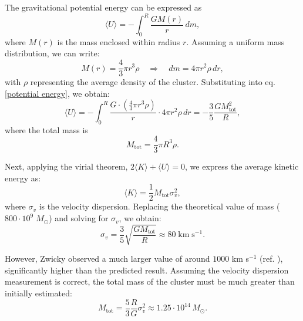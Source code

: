The gravitational potential energy can be expressed as
\begin{equation}\label{potential energy}
    \langle U \rangle = - \int_0 ^R \frac{G M(r)}{r} \, dm,
\end{equation}
where $M(r)$ is the mass enclosed within radius $r$. Assuming a uniform mass distribution, we can write:
\begin{equation}
    M(r) = \frac{4}{3} \pi r^3 \rho \quad \Rightarrow \quad dm = 4 \pi r^2 \rho \, dr,
\end{equation}
with $\rho$ representing the average density of the cluster. Substituting into eq. \eqref{potential energy}, we obtain:
\begin{equation}
    \langle U \rangle = - \int_0^R \frac{G \cdot \left(\frac{4}{3} \pi r^3 \rho\right)}{r} \cdot 4 \pi r^2 \rho \, dr 
    = -\frac{3}{5} \frac{G M_{\text{tot}}^2}{R},
\end{equation}
where the total mass is
\begin{equation}
    M_{\text{tot}} = \frac{4}{3} \pi R^3 \rho.
\end{equation}

Next, applying the virial theorem, $2 \langle K \rangle + \langle U \rangle = 0$, we express the average kinetic energy as:
\begin{equation}
    \langle K \rangle = \frac{1}{2} M_{\text{tot}} \sigma_v^2,
\end{equation}
where $\sigma_v$ is the velocity dispersion. Replacing the theoretical value of mass ($800 \cdot 10^9 \; M_\odot$) and solving for $\sigma_v$, we obtain:
\begin{equation}
    \sigma_v = \frac{3}{5} \sqrt{\frac{G M_{\text{tot}}}{R}} \approx 80 \; \text{km} \; \text{s}^{-1}.
\end{equation}

However, Zwicky observed a much larger value of around $1000$ km s$^{-1}$ (ref. \cite{Zwicky-1937}), significantly higher than the predicted result. Assuming the velocity dispersion measurement is correct, the total mass of the cluster must be much greater than initially estimated:
\begin{equation}
    M_{\text{tot}} = \frac{5}{3} \frac{R}{G} \sigma_v^2 \approx 1.25 \cdot 10^{14} \, M_\odot.
\end{equation}


